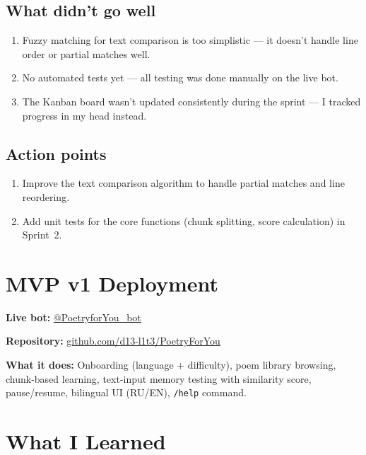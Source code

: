 \documentclass[11pt, a4paper]{article}
\begin{document}
\subsection*{What didn't go well}
\begin{enumerate}
    \item Fuzzy matching for text comparison is too simplistic --- it doesn't handle line order or partial matches well.
    \item No automated tests yet --- all testing was done manually on the live bot.
    \item The Kanban board wasn't updated consistently during the sprint --- I tracked progress in my head instead.
\end{enumerate}

\subsection*{Action points}
\begin{enumerate}
    \item Improve the text comparison algorithm to handle partial matches and line reordering.
    \item Add unit tests for the core functions (chunk splitting, score calculation) in Sprint~2.
\end{enumerate}


\section{MVP v1 Deployment}

\textbf{Live bot:} \href{https://t.me/PoetryforYou_bot}{@PoetryforYou\_bot}

\textbf{Repository:} \href{https://github.com/d13-l1t3/PoetryForYou}{github.com/d13-l1t3/PoetryForYou}

\textbf{What it does:} Onboarding (language + difficulty), poem library browsing, chunk-based learning, text-input memory testing with similarity score, pause/resume, bilingual UI (RU/EN), \texttt{/help} command.


\section{What I Learned}
\end{document}
